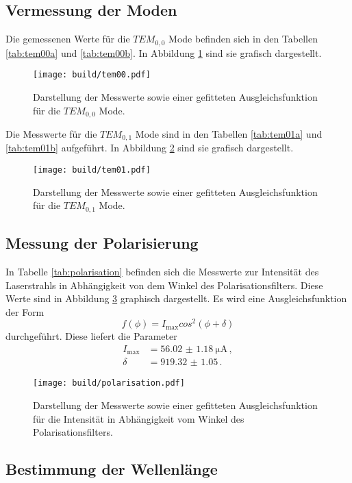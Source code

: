 \subsection{Vermessung der Moden}
\label{subsec:moden}

Die gemessenen Werte für die $TEM_{0,0}$ Mode befinden sich in den Tabellen \ref{tab:tem00a} und \ref{tab:tem00b}. In Abbildung \ref{fig:tem00} sind sie
grafisch dargestellt.

\begin{figure}
  \centering
  \texttt{[image: build/tem00.pdf]}
  \caption{Darstellung der Messwerte sowie einer gefitteten Ausgleichsfunktion für die $TEM_{0,0}$ Mode.}
  \label{fig:tem00}
\end{figure}

Die Messwerte für die $TEM_{0,1}$ Mode sind in den Tabellen \ref{tab:tem01a} und \ref{tab:tem01b} aufgeführt. In Abbildung \ref{fig:tem01} sind sie grafisch dargestellt.

\begin{figure}
  \centering
  \texttt{[image: build/tem01.pdf]}
  \caption{Darstellung der Messwerte sowie einer gefitteten Ausgleichsfunktion für die $TEM_{0,1}$ Mode.}
  \label{fig:tem01}
\end{figure}

\subsection{Messung der Polarisierung}
\label{subsec:polarisierung}

In Tabelle \ref{tab:polarisation} befinden sich die Messwerte zur Intensität des
Laserstrahls in Abhängigkeit von dem Winkel des Polarisationsfilters. Diese Werte
sind in Abbildung \ref{fig:polarisation} graphisch dargestellt. Es wird eine Ausgleichsfunktion der Form
\begin{equation*}
  f(\phi)=I_{\text{max}} cos^2(\phi+\delta)
\end{equation*}
durchgeführt. Diese liefert die Parameter
\begin{align*}
  I_{\text{max}}&=\SI{56.02(118)}{\micro\ampere} \,, \\
  \delta&=\SI{919.32(105)} \,.
\end{align*}

\begin{figure}
  \centering
  \texttt{[image: build/polarisation.pdf]}
  \caption{Darstellung der Messwerte sowie einer gefitteten Ausgleichsfunktion für die Intensität in
  Abhängigkeit vom Winkel des Polarisationsfilters.}
  \label{fig:polarisation}
\end{figure}


\subsection{Bestimmung der Wellenlänge}
\label{subsec:wellenlaenge}
